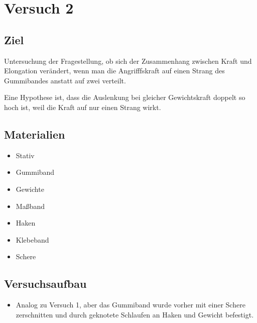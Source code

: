 \documentclass[
  9pt,
]{article}
\providecommand{\tightlist}{%
  \setlength{\itemsep}{0pt}\setlength{\parskip}{0pt}}
\begin{document}
\hypertarget{versuch-2}{%
\section{Versuch 2}\label{versuch-2}}

\hypertarget{ziel-1}{%
\subsection{Ziel}\label{ziel-1}}

Untersuchung der Fragestellung, ob sich der Zusammenhang zwischen Kraft
und Elongation verändert, wenn man die Angrifffskraft auf einen Strang
des Gummibandes anstatt auf zwei verteilt.

Eine Hypothese ist, dass die Auslenkung bei gleicher Gewichtskraft
doppelt so hoch ist, weil die Kraft auf nur einen Strang wirkt.

\hypertarget{materialien-1}{%
\subsection{Materialien}\label{materialien-1}}

\begin{itemize}
\tightlist
\item
  Stativ
\item
  Gummiband
\item
  Gewichte
\item
  Maßband
\item
  Haken
\item
  Klebeband
\item
  Schere
\end{itemize}

\hypertarget{versuchsaufbau-1}{%
\subsection{Versuchsaufbau}\label{versuchsaufbau-1}}

\begin{itemize}
\tightlist
\item
  Analog zu Versuch 1, aber das Gummiband wurde vorher mit einer Schere
  zerschnitten und durch geknotete Schlaufen an Haken und Gewicht
  befestigt.
\end{itemize}
\end{document}
